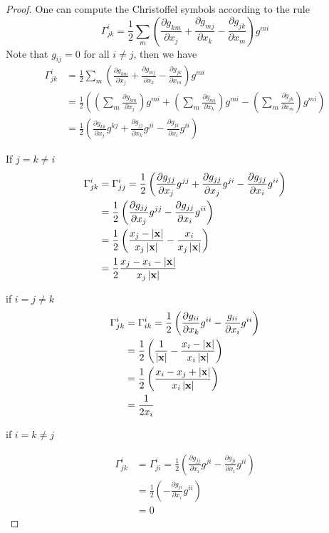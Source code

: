 \begin{proof}
One can compute the Christoffel symbols according to the rule
 \[
 \Gamma^i_{jk}=\frac{1}{2}\sum_m\left(\frac{\partial g_{km}}{\partial x_j}+\frac{\partial g_{mj}}{\partial x_k}-\frac{\partial g_{jk}}{\partial x_m}\right)g^{mi}
 \]
 Note that $g_{ij}=0$ for all $i\ne j$, then we have
 \begin{align}
 \Gamma^i_{jk}&=\frac{1}{2}\sum_m\left(\frac{\partial g_{km}}{\partial x_j}+\frac{\partial g_{mj}}{\partial x_k}-\frac{\partial g_{jk}}{\partial x_m}\right)g^{mi}
 \\
 &=\frac{1}{2}\left(\left(\sum_m\frac{\partial g_{km}}{\partial x_j}\right)g^{mi}+\left(\sum_m\frac{\partial g_{mi}}{\partial x_k}\right)g^{mi}-\left(\sum_m\frac{\partial g_{jk}}{\partial x_m}\right)g^{mi}\right)
 \\
 &=\frac{1}{2}\left(\frac{\partial g_{kk}}{\partial x_j}g^{kj}+\frac{\partial g_{jj}}{\partial x_k}g^{ji}-\frac{\partial g_{jk}}{\partial x_i}g^{ii}\right)
 \end{align} 
 
If $j=k\ne i$
\begin{align}
\Gamma_{jk}^i&=\Gamma_{jj}^i=\frac{1}{2}\left(\frac{\partial g_{jj}}{\partial x_j}g^{jj}+\frac{\partial g_{jj}}{\partial x_j}g^{ji}-\frac{\partial g_{jj}}{\partial x_i}g^{ii}\right)
\\
&=\frac{1}{2}\left(\frac{\partial g_{jj}}{\partial x_j}g^{jj}-\frac{\partial g_{jj}}{\partial x_i}g^{ii}\right)
\\
&=\frac{1}{2}\left(\frac{x_j-\left|\mathbf{x}\right|}{x_j\left|\mathbf{x}\right|}-\frac{x_i}{x_j\left|\mathbf{x}\right|}\right)
\\
&=\frac{1}{2}\frac{x_j-x_i-\left|\mathbf{x}\right|}{x_j\left|\mathbf{x}\right|}
\end{align}

if $i=j\ne k$
\begin{align}
\Gamma_{jk}^i&=\Gamma_{ik}^i=\frac{1}{2}\left(\frac{\partial g_{ii}}{\partial x_k}g^{ii}-\frac{g_{ii}}{\partial x_i}g^{ii}\right)
\\
&=\frac{1}{2}\left(\frac{1}{\left|\mathbf{x}\right|}-\frac{x_i-\left|\mathbf{x}\right|}{x_i\left|\mathbf{x}\right|}\right)
\\
&=\frac{1}{2}\left(\frac{x_i-x_j+\left|\mathbf{x}\right|}{x_i\left|\mathbf{x}\right|}\right)
\\
&=\frac{1}{2x_i}
\end{align}

if $i=k\ne j$

\begin{align}
\Gamma_{jk}^i&=\Gamma_{ji}^i=\frac{1}{2}\left(\frac{\partial g_{jj}}{\partial x_i}g^{ji}-\frac{\partial g_{ji}}{\partial x_i}g^{ii}\right)
\\
&=\frac{1}{2}\left(-\frac{\partial g_{ji}}{\partial x_i}g^{ii}\right)
\\
&=0
\end{align}


\end{proof}
